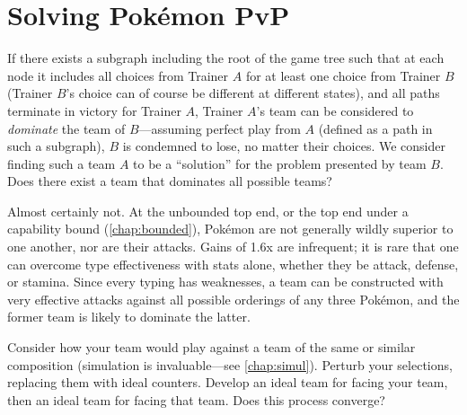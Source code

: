 \section{Solving Pokémon PvP\label{sec:solving}}
If there exists a subgraph including the root of the game tree such that at each
  node it includes all choices from Trainer $A$ for at least one choice from Trainer $B$
  (Trainer $B$'s choice can of course be different at different states), and all
  paths terminate in victory for Trainer $A$, Trainer $A$'s team can be considered
  to \textit{dominate} the team of $B$---assuming perfect play from $A$ (defined
  as a path in such a subgraph), $B$ is condemned to lose, no matter their choices.
We consider finding such a team $A$ to be a ``solution'' for the problem presented
  by team $B$.
Does there exist a team that dominates all possible teams?

Almost certainly not.
At the unbounded top end, or the top end under a capability bound (\autoref{chap:bounded}), Pokémon are not generally
  wildly superior to one another, nor are their attacks.
Gains of 1.6x are infrequent; it is rare that one can overcome type
  effectiveness with stats alone, whether they be attack, defense, or stamina.
Since every typing has weaknesses, a team can be constructed with
  very effective attacks against all possible orderings of any three Pokémon,
  and the former team is likely to dominate the latter.

Consider how your team would play against a team of the same or similar composition (simulation
  is invaluable---see \autoref{chap:simul}).
Perturb your selections, replacing them with ideal counters.
Develop an ideal team for facing your team, then an ideal team for facing that team.
Does this process converge?
